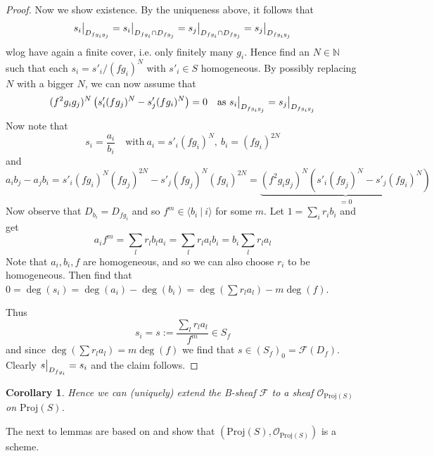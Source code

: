 \documentclass{scrartcl}
\newcommand{\N}{\mathbb{N}}
\newcommand{\Proj}{\mathrm{Proj}}
\renewcommand{\O}{\mathcal{O}}
\newcommand\restr[2]{{
    \left.\kern-\nulldelimiterspace
    #1
    \vphantom{\big|}
    \right|_{#2}
}}
\newtheorem{corollary}[prop]{Corollary}
\theoremstyle{definition}
\begin{document}
\begin{proof}
    Now we show existence.
    By the uniqueness above, it follows that
    \begin{equation*}
        \restr{s_i}{D_{fg_ig_j}} = \restr{s_i}{D_{fg_i} \cap D_{fg_j}} = \restr{s_j}{D_{fg_i} \cap D_{fg_j}} = \restr{s_j}{D_{fg_ig_j}}
    \end{equation*}
    wlog have again a finite cover, i.e. only finitely many $g_i$.
    Hence find an $N \in \N$ such that each $s_i = s'_i / (fg_i)^N$ with $s'_i \in S$ homogeneous.
    By possibly replacing $N$ with a bigger $N$, we can now assume that
    \begin{equation*}
        (f^2g_ig_j)^N \left( s'_i (fg_j)^N - s'_j (fg_i)^N \right) = 0 \quad \text{as $\restr{s_i}{D_{fg_ig_j}} = \restr{s_j}{D_{fg_ig_j}}$}
    \end{equation*}
    Now note that
    \begin{equation*}
        s_i = \frac {a_i} {b_i} \quad \text{with}\ a_i = s'_i(fg_i)^N, \ b_i = (fg_i)^{2N}
    \end{equation*}
    and
    \begin{equation*}
        a_i b_j - a_j b_i = s'_i (fg_i)^N (fg_j)^{2N} - s'_j (fg_j)^N (fg_i)^{2N} = \underbrace{(f^2g_ig_j)^N \left(s'_i (fg_j)^N - s'_j (fg_i)^N \right)}_{= 0}
    \end{equation*}
    Now observe that $D_{b_i} = D_{fg_i}$ and so $f^m \in \langle b_i \ | \ i \rangle$ for some $m$.
    Let $1 = \sum_i r_i b_i$ and get
    \begin{equation*}
        a_i f^m = \sum_l r_l b_l a_i = \sum_l r_l a_l b_i = b_i \sum_l r_l a_l
    \end{equation*}
    Note that $a_i, b_i, f$ are homogeneous, and so we can also choose $r_i$ to be homogeneous.
    Then find that $0 = \deg(s_i) = \deg(a_i) - \deg(b_i) = \deg(\sum r_l a_l) - m\deg(f)$.

    Thus
    \begin{equation*}
        s_i = s := \frac {\sum_l r_l a_l} {f^m} \in S_f
    \end{equation*}
    and since $\deg(\sum r_l a_l) = m\deg(f)$ we find that $s \in (S_f)_0 = \mathcal{F}(D_f)$.
    Clearly $\restr{s}{D_{fg_i}} = s_i$ and the claim follows.
\end{proof}
\begin{corollary}
    Hence we can (uniquely) extend the B-sheaf $\mathcal{F}$ to a sheaf $\O_{\Proj(S)}$ on $\Proj(S)$.
\end{corollary}
The next to lemmas are based on \cite[II.2.5]{hartshorne} and show that $(\Proj(S), \O_{\Proj(S)})$ is a scheme.
\end{document}
